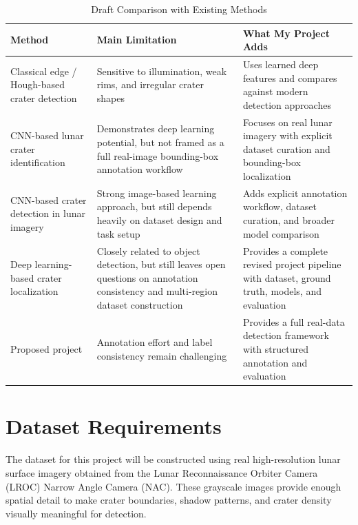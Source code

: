 \documentclass[conference]{IEEEtran}
\begin{document}
	\begin{table}[htbp]
		\caption{Draft Comparison with Existing Methods}
		\label{tab:comparison}
		\begin{center}
			\begin{tabular}{|m{2.35cm}|m{2.15cm}|m{2.35cm}|}
				\hline
				\textbf{Method} & \textbf{Main Limitation} & \textbf{What My Project Adds} \\
				\hline
				Classical edge / Hough-based crater detection & Sensitive to illumination, weak rims, and irregular crater shapes & Uses learned deep features and compares against modern detection approaches \\
				\hline
				CNN-based lunar crater identification \cite{silburt2019lunar} & Demonstrates deep learning potential, but not framed as a full real-image bounding-box annotation workflow & Focuses on real lunar imagery with explicit dataset curation and bounding-box localization \\
				\hline
				CNN-based crater detection in lunar imagery \cite{lee2020crater} & Strong image-based learning approach, but still depends heavily on dataset design and task setup & Adds explicit annotation workflow, dataset curation, and broader model comparison \\
				\hline
				Deep learning-based crater localization \cite{wang2022crater} & Closely related to object detection, but still leaves open questions on annotation consistency and multi-region dataset construction & Provides a complete revised project pipeline with dataset, ground truth, models, and evaluation \\
				\hline
				Proposed project & Annotation effort and label consistency remain challenging & Provides a full real-data detection framework with structured annotation and evaluation \\
				\hline
			\end{tabular}
		\end{center}
	\end{table}
	
	\section{Dataset Requirements}
	The dataset for this project will be constructed using real high-resolution lunar surface imagery obtained from the Lunar Reconnaissance Orbiter Camera (LROC) Narrow Angle Camera (NAC). These grayscale images provide enough spatial detail to make crater boundaries, shadow patterns, and crater density visually meaningful for detection.
	
\end{document}
